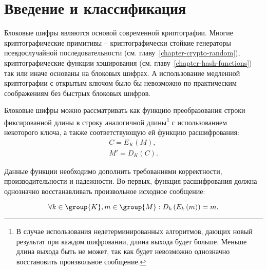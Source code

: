 \section{Введение и классификация}\label{section-block-ciphers-intro}

Блоковые шифры являются основой современной криптографии. Многие криптографические примитивы -- криптографически стойкие генераторы псевдослучайной последовательности (см. главу~\ref{chapter-crypto-random}), криптографические функции хэширования (см. главу~\ref{chapter-hash-functions}) так или иначе основаны на блоковых шифрах. А использование медленной криптографии с открытым ключом было бы невозможно по практическим соображениям без быстрых блоковых шифров.

Блоковые шифры можно рассматривать как функцию преобразования строки фиксированной длины в строку аналогичной длины\footnote{В случае использования недетерминированных алгоритмов, дающих новый результат при каждом шифровании, длина выхода будет больше. Меньше длина выхода быть не может, так как будет невозможно однозначно восстановить произвольное сообщение.} с использованием некоторого ключа, а также соответствующую ей функцию расшифрования:
\[\begin{array}{l}
	C = E_K\left( M \right), \\
	M'= D_K\left( C \right).
\end{array}\]

Данные функции необходимо дополнить требованиями корректности, производительности и надежности. Во-первых, функция расшифрования должна однозначно восстанавливать произвольное исходное сообщение:

\[ \forall k \in \group{K}, m \in \group{M}: D_k \left( E_k\left( m \right) \right) = m. \]

